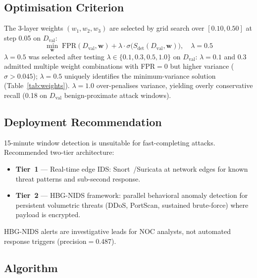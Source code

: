 \documentclass[journal,10pt,twoside]{IEEEtran}
\newcommand{\dval}{$D_{\mathrm{val}}$}
\begin{document}
\subsection{Optimisation Criterion}
The 3-layer weights $(w_1,w_2,w_3)$ are selected by grid search
over $[0.10,0.50]$ at step 0.05 on \dval{}:
\begin{equation}
\label{eq:criterion}
\min_{\mathbf{w}}\;
  \mathrm{FPR}(D_{\mathrm{val}},\mathbf{w})
  +\lambda\cdot\sigma\!\bigl(S_{\mathrm{det}}
    (D_{\mathrm{val}},\mathbf{w})\bigr),
\quad\lambda=0.5
\end{equation}
$\lambda{=}0.5$ was selected after testing
$\lambda\in\{0.1,0.3,0.5,1.0\}$ on \dval{}: $\lambda{=}0.1$ and
$0.3$ admitted multiple weight combinations with FPR$=$0 but higher
variance ($\sigma{>}0.045$); $\lambda{=}0.5$ uniquely identifies
the minimum-variance solution (Table~\ref{tab:weights}).
$\lambda{=}1.0$ over-penalises variance, yielding overly
conservative recall (0.18 on \dval{} benign-proximate attack
windows).

\subsection{Deployment Recommendation}
\label{sec:deploy}
15-minute window detection is unsuitable for fast-completing
attacks.  Recommended two-tier architecture:
\begin{itemize}
  \item \textbf{Tier~1} --- Real-time edge IDS:
    Snort~\cite{snort2021}/Suricata at network edges for known
    threat patterns and sub-second response.
  \item \textbf{Tier~2} --- HBG-NIDS framework: parallel
    behavioral anomaly detection for persistent volumetric threats
    (DDoS, PortScan, sustained brute-force) where payload is
    encrypted.
\end{itemize}
HBG-NIDS alerts are investigative leads for NOC analysts, not
automated response triggers (precision$=$0.487).

\subsection{Algorithm}
\end{document}
